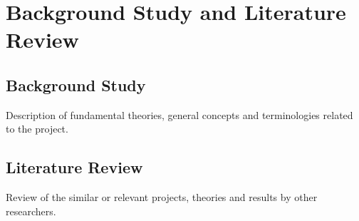 \chapter{Background Study and Literature Review}

\lipsum[1]

\lipsum[2]

\section{Background Study}
Description of fundamental theories, general concepts and terminologies related to the project.
\section{Literature Review}
Review of the similar or relevant projects, theories and results by other researchers.